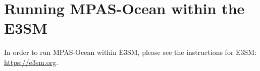 \chapter{Running MPAS-Ocean within the E3SM}
\label{chap:E3SM_ocean_coupling}

In order to run MPAS-Ocean within E3SM, please see the instructions for E3SM:
\href{https://e3sm.org}{https://e3sm.org}.
